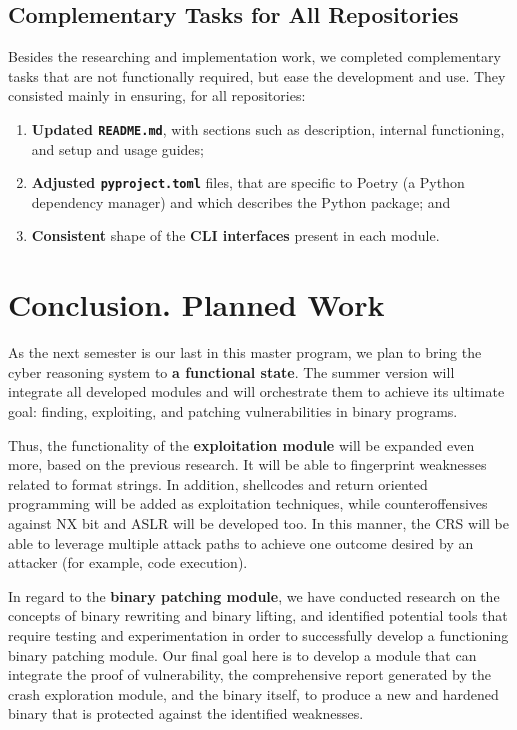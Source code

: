 \documentclass[12pt,a4paper,english,onecolumn]{IEEEtran}
\begin{document}
\subsection{Complementary Tasks for All Repositories}

Besides the researching and implementation work, we completed complementary tasks that are not functionally required, but ease the development and use. They consisted mainly in ensuring, for all repositories:

\begin{enumerate}
    \item \textbf{Updated \texttt{README.md}}, with sections such as description, internal functioning, and setup and usage guides;
    \item  \textbf{Adjusted \texttt{pyproject.toml}} files, that are specific to Poetry (a Python dependency manager) and which describes the Python package; and
    \item  \textbf{Consistent} shape of the \textbf{CLI interfaces} present in each module.
\end{enumerate}

\section{Conclusion. Planned Work}

As the next semester is our last in this master program, we plan to bring the cyber reasoning system to \textbf{a functional state}. The summer version will integrate all developed modules and will orchestrate them to achieve its ultimate goal: finding, exploiting, and patching vulnerabilities in binary programs.

Thus, the functionality of the \textbf{exploitation module} will be expanded even more, based on the previous research. It will be able to fingerprint weaknesses related to format strings. In addition, shellcodes and return oriented programming will be added as exploitation techniques, while counteroffensives against NX bit and ASLR will be developed too. In this manner, the CRS will be able to leverage multiple attack paths to achieve one outcome desired by an attacker (for example, code execution).

In regard to the \textbf{binary patching module}, we have conducted research on the concepts of binary rewriting and binary lifting, and identified potential tools that require testing and experimentation in order to successfully develop a functioning binary patching module. Our final goal here is to develop a module that can integrate the proof of vulnerability, the comprehensive report generated by the crash exploration module, and the binary itself, to produce a new and hardened binary that is protected against the identified weaknesses.
\end{document}
